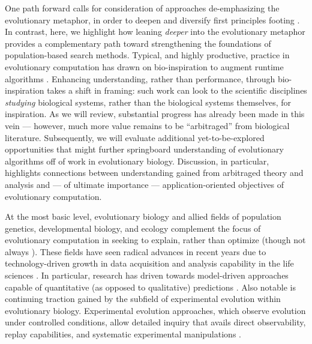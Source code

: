One path forward calls for consideration of approaches de-emphasizing the evolutionary metaphor, in order to deepen and diversify first principles footing \citep{moore2023evolution}.
In contrast, here, we highlight how leaning \textit{deeper} into the evolutionary metaphor provides a complementary path toward strengthening the foundations of population-based search methods.
Typical, and highly productive, practice in evolutionary computation has drawn on bio-inspiration to augment runtime algorithms \citep{banzhaf2006artificial,kumar2003biologically}.
Enhancing understanding, rather than performance, through bio-inspiration takes a shift in framing: such work can look to the scientific disciplines \textit{studying} biological systems, rather than the biological systems themselves, for inspiration.
As we will review, substantial progress has already been made in this vein --- however, much more value remains to be ``arbitraged'' from biological literature.
Subsequently, we will evaluate additional yet-to-be-explored opportunities that might further springboard understanding of evolutionary algorithms off of work in evolutionary biology.
Discussion, in particular, highlights connections between understanding gained from arbitraged theory and analysis and --- of ultimate importance --- application-oriented objectives of evolutionary computation.

At the most basic level, evolutionary biology and allied fields of population genetics, developmental biology, and ecology complement the focus of evolutionary computation in seeking to explain, rather than optimize (though not always \citep{cobb2013directed,carroll2014applying}).
These fields have seen radical advances in recent years due to technology-driven growth in data acquisition and analysis capability in the life sciences \citep{TODO}.
In particular, research has driven towards model-driven approaches capable of quantitative (as opposed to qualitative) predictions \citep{TODO}.
Also notable is continuing traction gained by the subfield of experimental evolution within evolutionary biology.
Experimental evolution approaches, which observe evolution under controlled conditions, allow detailed inquiry that avails direct observability, replay capabilities, and systematic experimental manipulations \citep{kawecki2012experimental}.


